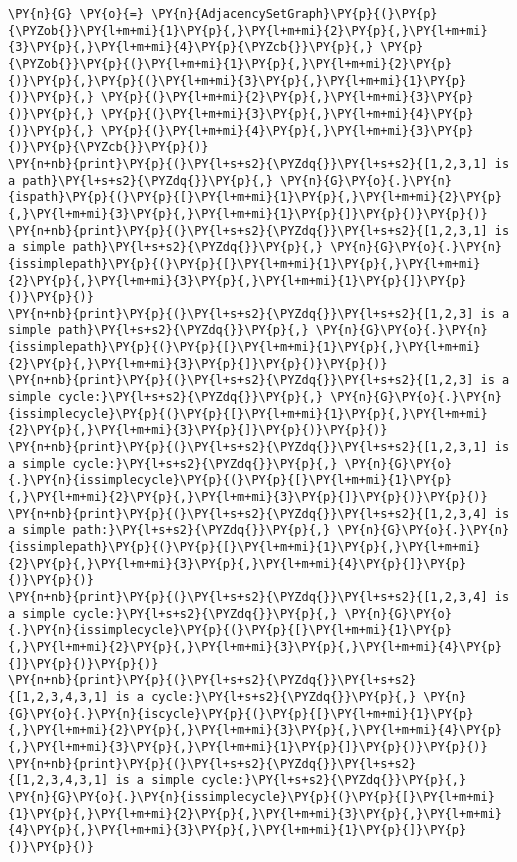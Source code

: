\begin{Verbatim}[commandchars=\\\{\}]
\PY{n}{G} \PY{o}{=} \PY{n}{AdjacencySetGraph}\PY{p}{(}\PY{p}{\PYZob{}}\PY{l+m+mi}{1}\PY{p}{,}\PY{l+m+mi}{2}\PY{p}{,}\PY{l+m+mi}{3}\PY{p}{,}\PY{l+m+mi}{4}\PY{p}{\PYZcb{}}\PY{p}{,} \PY{p}{\PYZob{}}\PY{p}{(}\PY{l+m+mi}{1}\PY{p}{,}\PY{l+m+mi}{2}\PY{p}{)}\PY{p}{,}\PY{p}{(}\PY{l+m+mi}{3}\PY{p}{,}\PY{l+m+mi}{1}\PY{p}{)}\PY{p}{,} \PY{p}{(}\PY{l+m+mi}{2}\PY{p}{,}\PY{l+m+mi}{3}\PY{p}{)}\PY{p}{,} \PY{p}{(}\PY{l+m+mi}{3}\PY{p}{,}\PY{l+m+mi}{4}\PY{p}{)}\PY{p}{,} \PY{p}{(}\PY{l+m+mi}{4}\PY{p}{,}\PY{l+m+mi}{3}\PY{p}{)}\PY{p}{\PYZcb{}}\PY{p}{)}
\PY{n+nb}{print}\PY{p}{(}\PY{l+s+s2}{\PYZdq{}}\PY{l+s+s2}{[1,2,3,1] is a path}\PY{l+s+s2}{\PYZdq{}}\PY{p}{,} \PY{n}{G}\PY{o}{.}\PY{n}{ispath}\PY{p}{(}\PY{p}{[}\PY{l+m+mi}{1}\PY{p}{,}\PY{l+m+mi}{2}\PY{p}{,}\PY{l+m+mi}{3}\PY{p}{,}\PY{l+m+mi}{1}\PY{p}{]}\PY{p}{)}\PY{p}{)}
\PY{n+nb}{print}\PY{p}{(}\PY{l+s+s2}{\PYZdq{}}\PY{l+s+s2}{[1,2,3,1] is a simple path}\PY{l+s+s2}{\PYZdq{}}\PY{p}{,} \PY{n}{G}\PY{o}{.}\PY{n}{issimplepath}\PY{p}{(}\PY{p}{[}\PY{l+m+mi}{1}\PY{p}{,}\PY{l+m+mi}{2}\PY{p}{,}\PY{l+m+mi}{3}\PY{p}{,}\PY{l+m+mi}{1}\PY{p}{]}\PY{p}{)}\PY{p}{)}
\PY{n+nb}{print}\PY{p}{(}\PY{l+s+s2}{\PYZdq{}}\PY{l+s+s2}{[1,2,3] is a simple path}\PY{l+s+s2}{\PYZdq{}}\PY{p}{,} \PY{n}{G}\PY{o}{.}\PY{n}{issimplepath}\PY{p}{(}\PY{p}{[}\PY{l+m+mi}{1}\PY{p}{,}\PY{l+m+mi}{2}\PY{p}{,}\PY{l+m+mi}{3}\PY{p}{]}\PY{p}{)}\PY{p}{)}
\PY{n+nb}{print}\PY{p}{(}\PY{l+s+s2}{\PYZdq{}}\PY{l+s+s2}{[1,2,3] is a simple cycle:}\PY{l+s+s2}{\PYZdq{}}\PY{p}{,} \PY{n}{G}\PY{o}{.}\PY{n}{issimplecycle}\PY{p}{(}\PY{p}{[}\PY{l+m+mi}{1}\PY{p}{,}\PY{l+m+mi}{2}\PY{p}{,}\PY{l+m+mi}{3}\PY{p}{]}\PY{p}{)}\PY{p}{)}
\PY{n+nb}{print}\PY{p}{(}\PY{l+s+s2}{\PYZdq{}}\PY{l+s+s2}{[1,2,3,1] is a simple cycle:}\PY{l+s+s2}{\PYZdq{}}\PY{p}{,} \PY{n}{G}\PY{o}{.}\PY{n}{issimplecycle}\PY{p}{(}\PY{p}{[}\PY{l+m+mi}{1}\PY{p}{,}\PY{l+m+mi}{2}\PY{p}{,}\PY{l+m+mi}{3}\PY{p}{]}\PY{p}{)}\PY{p}{)}
\PY{n+nb}{print}\PY{p}{(}\PY{l+s+s2}{\PYZdq{}}\PY{l+s+s2}{[1,2,3,4] is a simple path:}\PY{l+s+s2}{\PYZdq{}}\PY{p}{,} \PY{n}{G}\PY{o}{.}\PY{n}{issimplepath}\PY{p}{(}\PY{p}{[}\PY{l+m+mi}{1}\PY{p}{,}\PY{l+m+mi}{2}\PY{p}{,}\PY{l+m+mi}{3}\PY{p}{,}\PY{l+m+mi}{4}\PY{p}{]}\PY{p}{)}\PY{p}{)}
\PY{n+nb}{print}\PY{p}{(}\PY{l+s+s2}{\PYZdq{}}\PY{l+s+s2}{[1,2,3,4] is a simple cycle:}\PY{l+s+s2}{\PYZdq{}}\PY{p}{,} \PY{n}{G}\PY{o}{.}\PY{n}{issimplecycle}\PY{p}{(}\PY{p}{[}\PY{l+m+mi}{1}\PY{p}{,}\PY{l+m+mi}{2}\PY{p}{,}\PY{l+m+mi}{3}\PY{p}{,}\PY{l+m+mi}{4}\PY{p}{]}\PY{p}{)}\PY{p}{)}
\PY{n+nb}{print}\PY{p}{(}\PY{l+s+s2}{\PYZdq{}}\PY{l+s+s2}{[1,2,3,4,3,1] is a cycle:}\PY{l+s+s2}{\PYZdq{}}\PY{p}{,} \PY{n}{G}\PY{o}{.}\PY{n}{iscycle}\PY{p}{(}\PY{p}{[}\PY{l+m+mi}{1}\PY{p}{,}\PY{l+m+mi}{2}\PY{p}{,}\PY{l+m+mi}{3}\PY{p}{,}\PY{l+m+mi}{4}\PY{p}{,}\PY{l+m+mi}{3}\PY{p}{,}\PY{l+m+mi}{1}\PY{p}{]}\PY{p}{)}\PY{p}{)}
\PY{n+nb}{print}\PY{p}{(}\PY{l+s+s2}{\PYZdq{}}\PY{l+s+s2}{[1,2,3,4,3,1] is a simple cycle:}\PY{l+s+s2}{\PYZdq{}}\PY{p}{,} \PY{n}{G}\PY{o}{.}\PY{n}{issimplecycle}\PY{p}{(}\PY{p}{[}\PY{l+m+mi}{1}\PY{p}{,}\PY{l+m+mi}{2}\PY{p}{,}\PY{l+m+mi}{3}\PY{p}{,}\PY{l+m+mi}{4}\PY{p}{,}\PY{l+m+mi}{3}\PY{p}{,}\PY{l+m+mi}{1}\PY{p}{]}\PY{p}{)}\PY{p}{)}
\end{Verbatim}



